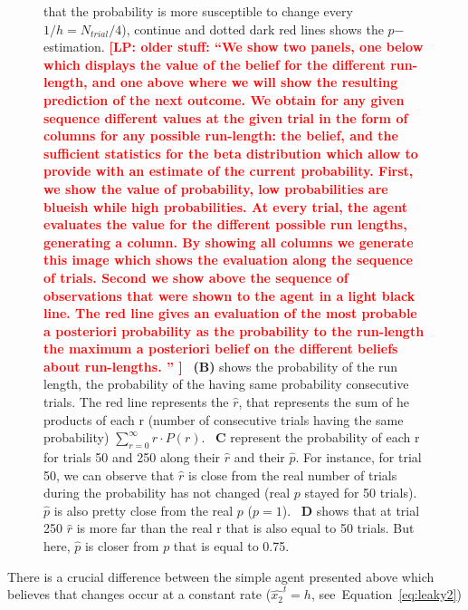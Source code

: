 \documentclass[12pt,english]{article}%
\newcommand{\seeEq}[1]{Equation~\ref{eq:#1}}
\newcommand{\LP}[1]{\textbf{\textcolor{red}{[LP: #1]}}}
\begin{document}
\begin{figure}
{that the probability is more susceptible to change every $1/h=N_{trial}/4$), 
continue and dotted dark red lines shows the $p$$-$estimation.
\LP{ older stuff: ``We show two panels, one below which displays 
the value of the belief for the different run-length, 
and one above where we will show the resulting prediction of the next outcome.
We obtain for any given sequence different values at the given trial
in the form of columns for any possible run-length: 
the belief, and the sufficient statistics for the beta distribution 
which allow to provide with an estimate of the current probability.
First, we show the value of probability, 
low probabilities are blueish while high probabilities. 
At every trial, the agent evaluates the value 
for the different possible run lengths, generating a column. 
By showing all columns we generate this image 
which shows the evaluation along the sequence of trials.
Second we show above the sequence of observations 
that were shown to the agent in a light black line. 
The red line gives an evaluation of the most probable 
a posteriori probability as the probability to the run-length 
the maximum a posteriori belief on the different beliefs about run-lengths. ''
}
~\textbf{(B)} shows the probability of the run length, 
the probability of the having same probability consecutive trials. 
The red line represents the $\hat{r}$, 
that represents the sum of he products of each r
(number of consecutive trials having the same probability)  
$\sum_{r=0}^\infty r \cdot P(r)$.
~\textbf{C} represent the probability of each r for trials 50 and 250 
along their $\hat{r}$ and their $\hat{p}$. 
For instance, for trial 50, we can observe that $\hat{r}$ is close 
from the real number of trials during the probability has not changed (real $p$ stayed for 50 trials). 
$\hat{p}$ is also pretty close from the real $p$ ($p=1$).
~\textbf{D} shows that at trial 250 $\hat{r}$ is more far than the real r 
that is also equal to 50 trials. 
But here, $\hat{p}$ is closer from $p$ that is equal to 0.75.
}
\label{fig:bayesianchangepoint}
\end{figure}
There is a crucial difference between the simple agent presented above 
which believes that changes occur at a constant rate ($\hat{x_2}^t=h$, see~\seeEq{leaky2})
\end{document}
